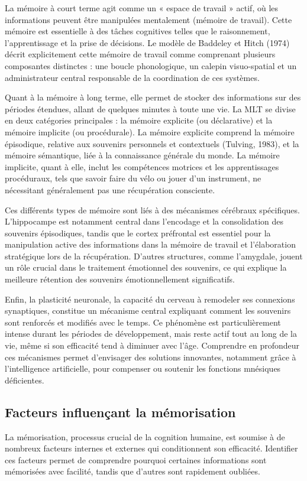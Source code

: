 \documentclass[12pt,a4paper]{report}
\begin{document}
La mémoire à court terme agit comme un « espace de travail » actif, où les informations peuvent être manipulées mentalement (mémoire de travail). Cette mémoire est essentielle à des tâches cognitives telles que le raisonnement, l'apprentissage et la prise de décisions. Le modèle de Baddeley et Hitch (1974) décrit explicitement cette mémoire de travail comme comprenant plusieurs composantes distinctes : une boucle phonologique, un calepin visuo-spatial et un administrateur central responsable de la coordination de ces systèmes.

Quant à la mémoire à long terme, elle permet de stocker des informations sur des périodes étendues, allant de quelques minutes à toute une vie. La MLT se divise en deux catégories principales : la mémoire explicite (ou déclarative) et la mémoire implicite (ou procédurale). La mémoire explicite comprend la mémoire épisodique, relative aux souvenirs personnels et contextuels (Tulving, 1983), et la mémoire sémantique, liée à la connaissance générale du monde. La mémoire implicite, quant à elle, inclut les compétences motrices et les apprentissages procéduraux, tels que savoir faire du vélo ou jouer d'un instrument, ne nécessitant généralement pas une récupération consciente.

Ces différents types de mémoire sont liés à des mécanismes cérébraux spécifiques. L'hippocampe est notamment central dans l'encodage et la consolidation des souvenirs épisodiques, tandis que le cortex préfrontal est essentiel pour la manipulation active des informations dans la mémoire de travail et l’élaboration stratégique lors de la récupération. D'autres structures, comme l'amygdale, jouent un rôle crucial dans le traitement émotionnel des souvenirs, ce qui explique la meilleure rétention des souvenirs émotionnellement significatifs.

Enfin, la plasticité neuronale, la capacité du cerveau à remodeler ses connexions synaptiques, constitue un mécanisme central expliquant comment les souvenirs sont renforcés et modifiés avec le temps. Ce phénomène est particulièrement intense durant les périodes de développement, mais reste actif tout au long de la vie, même si son efficacité tend à diminuer avec l'âge. Comprendre en profondeur ces mécanismes permet d’envisager des solutions innovantes, notamment grâce à l’intelligence artificielle, pour compenser ou soutenir les fonctions mnésiques déficientes.

\vspace{0.5cm}

\subsection{Facteurs influençant la mémorisation}
La mémorisation, processus crucial de la cognition humaine, est soumise à de nombreux facteurs internes et externes qui conditionnent son efficacité. Identifier ces facteurs permet de comprendre pourquoi certaines informations sont mémorisées avec facilité, tandis que d’autres sont rapidement oubliées.
\end{document}
